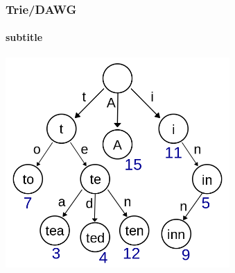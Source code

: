 \documentclass[10pt]{beamer}
\begin{document}
\begin{frame}[fragile]
  \frametitle{Trie/DAWG}
  \framesubtitle{subtitle}
  
  \centerline{\includegraphics[height=8cm]{wikitrie.png}}
\end{frame}
\end{document}
